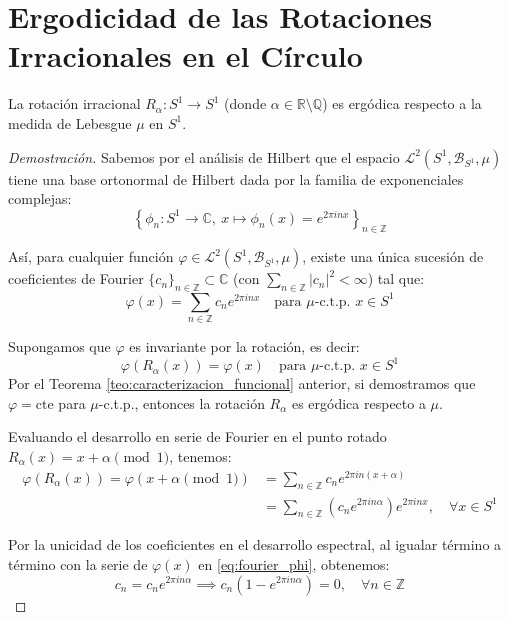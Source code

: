 \section{Ergodicidad de las Rotaciones Irracionales en el Círculo}

\begin{proposicion} \label{prop:rotacion_irracional_ergodica}
	La rotación irracional $R_\alpha: S^1 \to S^1$ (donde $\alpha \in \mathbb{R} \setminus \mathbb{Q}$) es ergódica respecto a la medida de Lebesgue $\mu$ en $S^1$.
\end{proposicion}

\begin{proof}[Demostración]
	Sabemos por el análisis de Hilbert que el espacio $\mathcal{L}^2(S^1, \mathcal{B}_{S^1}, \mu)$ tiene una base ortonormal de Hilbert dada por la familia de exponenciales complejas:
	$$ \left\{ \phi_n: S^1 \to \mathbb{C}, \ x \mapsto \phi_n(x) = e^{2\pi i n x} \right\}_{n \in \mathbb{Z}} $$
	
	Así, para cualquier función $\varphi \in \mathcal{L}^2(S^1, \mathcal{B}_{S^1}, \mu)$, existe una única sucesión de coeficientes de Fourier $\{c_n\}_{n \in \mathbb{Z}} \subset \mathbb{C}$ (con $\sum_{n \in \mathbb{Z}} |c_n|^2 < \infty$) tal que:
	\begin{equation} \label{eq:fourier_phi}
		\varphi(x) = \sum_{n \in \mathbb{Z}} c_n e^{2\pi i n x} \quad \text{para } \mu\text{-c.t.p. } x \in S^1
	\end{equation}
	
	Supongamos que $\varphi$ es invariante por la rotación, es decir:
	$$ \varphi(R_\alpha(x)) = \varphi(x) \quad \text{para } \mu\text{-c.t.p. } x \in S^1 $$
	Por el Teorema \ref{teo:caracterizacion_funcional} anterior, si demostramos que $\varphi = \text{cte}$ para $\mu$-c.t.p., entonces la rotación $R_\alpha$ es ergódica respecto a $\mu$.
	
	Evaluando el desarrollo en serie de Fourier en el punto rotado $R_\alpha(x) = x + \alpha \pmod 1$, tenemos:
	\begin{align*}
		\varphi(R_\alpha(x)) = \varphi(x + \alpha \pmod 1) &= \sum_{n \in \mathbb{Z}} c_n e^{2\pi i n (x + \alpha)} \\
		&= \sum_{n \in \mathbb{Z}} \left( c_n e^{2\pi i n \alpha} \right) e^{2\pi i n x}, \quad \forall x \in S^1
	\end{align*}
	
	Por la unicidad de los coeficientes en el desarrollo espectral, al igualar término a término con la serie de $\varphi(x)$ en \eqref{eq:fourier_phi}, obtenemos:
	$$ c_n = c_n e^{2\pi i n \alpha} \implies c_n \left( 1 - e^{2\pi i n \alpha} \right) = 0, \quad \forall n \in \mathbb{Z} $$
	

\end{proof}
